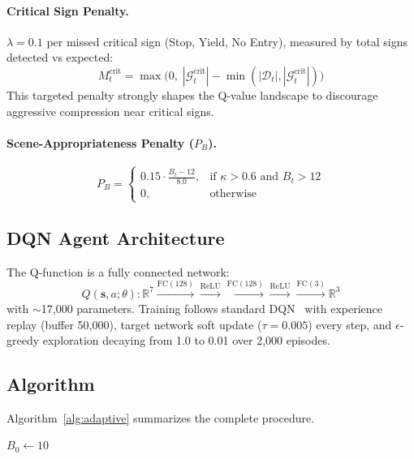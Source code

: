 \documentclass[10pt,journal]{IEEEtran}
\begin{document}
\paragraph{Critical Sign Penalty.}
$\lambda = 0.1$ per missed critical sign (Stop, Yield, No Entry), measured by total signs detected vs expected:
\begin{equation}
\label{eq:penalty}
    M_t^{\text{crit}} = \max\!\big(0, \; |\mathcal{G}_t^{\text{crit}}| - \min(|\mathcal{D}_t|, |\mathcal{G}_t^{\text{crit}}|)\big)
\end{equation}
This targeted penalty strongly shapes the Q-value landscape to discourage aggressive compression near critical signs.

\paragraph{Scene-Appropriateness Penalty ($P_B$).}
\begin{equation}
    P_B = \begin{cases}
        0.15 \cdot \frac{B_t - 12}{8.0}, & \text{if } \kappa > 0.6 \text{ and } B_t > 12 \\[3pt]
        0, & \text{otherwise}
    \end{cases}
\end{equation}

\subsection{DQN Agent Architecture}

The Q-function is a fully connected network:
\[
    Q(\mathbf{s}, a; \theta) : \mathbb{R}^7 \xrightarrow{\text{FC}(128)} \xrightarrow{\text{ReLU}} \xrightarrow{\text{FC}(128)} \xrightarrow{\text{ReLU}} \xrightarrow{\text{FC}(3)} \mathbb{R}^3
\]
with ${\sim}$17,000 parameters. Training follows standard DQN~\cite{mnih2015dqn} with experience replay (buffer 50,000), target network soft update ($\tau=0.005$) every step, and $\epsilon$-greedy exploration decaying from 1.0 to 0.01 over 2,000 episodes.

\subsection{Algorithm}

Algorithm~\ref{alg:adaptive} summarizes the complete procedure.

\begin{algorithm}[!htb]
\caption{Safety-Aware Adaptive Video Compression}
\label{alg:adaptive}
$B_0 \gets 10$\;
\end{algorithm}
\end{document}
